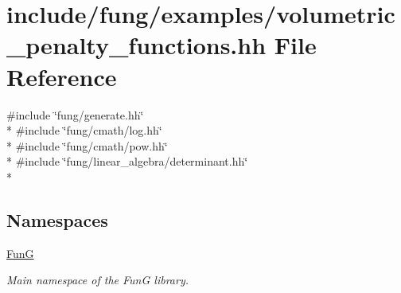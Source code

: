 \hypertarget{volumetric__penalty__functions_8hh}{}\section{include/fung/examples/volumetric\+\_\+penalty\+\_\+functions.hh File Reference}
\label{volumetric__penalty__functions_8hh}
{\ttfamily \#include \char`\"{}fung/generate.\+hh\char`\"{}}\\*
{\ttfamily \#include \char`\"{}fung/cmath/log.\+hh\char`\"{}}\\*
{\ttfamily \#include \char`\"{}fung/cmath/pow.\+hh\char`\"{}}\\*
{\ttfamily \#include \char`\"{}fung/linear\+\_\+algebra/determinant.\+hh\char`\"{}}\\*
\subsection*{Namespaces}
\begin{DoxyCompactItemize}
\item 
 \hyperlink{namespaceFunG}{FunG}
\begin{DoxyCompactList}\small\item\em Main namespace of the FunG library. \end{DoxyCompactList}\end{DoxyCompactItemize}
